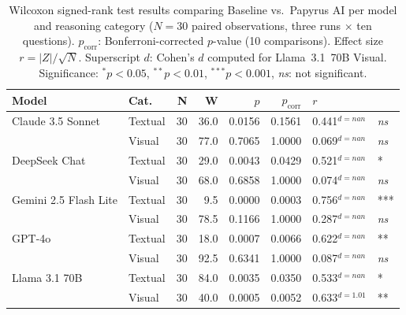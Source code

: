 \begin{table}[htbp]
\caption{Wilcoxon signed-rank test results comparing Baseline vs.\
Papyrus AI per model and reasoning category ($N=30$ paired observations,
three runs $\times$ ten questions).
$p_{\text{corr}}$: Bonferroni-corrected $p$-value (10 comparisons).
Effect size $r = |Z|/\sqrt{N}$.
Superscript $d$: Cohen's $d$ computed for Llama~3.1~70B Visual.
Significance: $^{*}p<0.05$, $^{**}p<0.01$, $^{***}p<0.001$,
\textit{ns}: not significant.}
\label{tab:statistics}
\begin{tabularx}{\columnwidth}{llrrrrl}
\toprule
\textbf{Model} & \textbf{Cat.} & \textbf{N} & \textbf{W} & \textbf{$p$} &
\textbf{$p_{\text{corr}}$} & \textbf{$r$} \\
\midrule
  Claude 3.5 Sonnet & Textual & 30 & 36.0 & 0.0156 & 0.1561 & 0.441$^{d=nan}$ & \textit{ns} \\
   & Visual & 30 & 77.0 & 0.7065 & 1.0000 & 0.069$^{d=nan}$ & \textit{ns} \\
  DeepSeek Chat & Textual & 30 & 29.0 & 0.0043 & 0.0429 & 0.521$^{d=nan}$ & * \\
   & Visual & 30 & 68.0 & 0.6858 & 1.0000 & 0.074$^{d=nan}$ & \textit{ns} \\
  Gemini 2.5 Flash Lite & Textual & 30 & 9.5 & 0.0000 & 0.0003 & 0.756$^{d=nan}$ & *** \\
   & Visual & 30 & 78.5 & 0.1166 & 1.0000 & 0.287$^{d=nan}$ & \textit{ns} \\
  GPT-4o & Textual & 30 & 18.0 & 0.0007 & 0.0066 & 0.622$^{d=nan}$ & ** \\
   & Visual & 30 & 92.5 & 0.6341 & 1.0000 & 0.087$^{d=nan}$ & \textit{ns} \\
  Llama 3.1 70B & Textual & 30 & 84.0 & 0.0035 & 0.0350 & 0.533$^{d=nan}$ & * \\
   & Visual & 30 & 40.0 & 0.0005 & 0.0052 & 0.633$^{d=1.01}$ & ** \\
\bottomrule
\end{tabularx}
\end{table}
